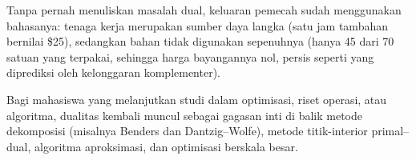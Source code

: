 \medskip

Tanpa pernah menuliskan masalah dual, keluaran pemecah sudah menggunakan bahasanya: tenaga kerja merupakan sumber daya langka (satu jam tambahan bernilai \$25), sedangkan bahan tidak digunakan sepenuhnya (hanya 45 dari 70 satuan yang terpakai, sehingga harga bayangannya nol, persis seperti yang diprediksi oleh kelonggaran komplementer).

Bagi mahasiswa yang melanjutkan studi dalam optimisasi, riset operasi, atau algoritma, dualitas kembali muncul sebagai gagasan inti di balik metode dekomposisi (misalnya Benders dan Dantzig--Wolfe), metode titik-interior primal--dual, algoritma aproksimasi, dan optimisasi berskala besar.

